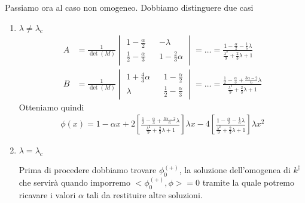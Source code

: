 Passiamo ora al caso non omogeneo. Dobbiamo distinguere due casi
\begin{enumerate}
	\item  $\lambda \neq \lambda_c$
	\begin{align}
		A &= \frac{1}{\det (M)} \begin{vmatrix} 
			1 - \frac{\alpha}{2} && -\lambda \\
			\frac{1}{2} - \frac{\alpha}{3} && 1 - \frac{2}{3}\alpha		
		\end{vmatrix} = \dots = \frac{1 - \frac{\alpha}{2} - \frac{1}{6} \lambda}{\frac{\lambda^2}{9} + \frac{2}{3}\lambda + 1} \\
		B &= \frac{1}{\det (M)} \begin{vmatrix} 
			1 + \frac{4}{3}\alpha && 1 - \frac{\alpha}{2} \\
			\lambda && \frac{1}{2} - \frac{\alpha}{3}		
		\end{vmatrix} = \dots = \frac{\frac{1}{2} - \frac{\alpha}{3} + \frac{3\alpha -2}{6} \lambda}{\frac{\lambda^2}{9} + \frac{2}{3}\lambda + 1}	
	\end{align}
	Otteniamo quindi
	\begin{align}
		\phi(x) = 1 -\alpha x + 2 \left[ \frac{\frac{1}{2} - \frac{\alpha}{3} + \frac{3\alpha -2}{6} \lambda}{\frac{\lambda^2}{9} + \frac{2}{3}\lambda + 1} \right] \lambda x - 4 \left[ \frac{1 - \frac{\alpha}{2} - \frac{1}{6} \lambda}{\frac{\lambda^2}{9} + \frac{2}{3}\lambda + 1} \right] \lambda x^2
	\end{align}
	
	\item  $\lambda = \lambda_c$
	
	Prima di procedere dobbiamo trovare $\phi_0^{(+)}$, la soluzione dell'omogenea di $k^\dagger$ che servirà quando imporremo $<\phi_0^{(+)}, \phi> = 0$ tramite la quale potremo ricavare i valori $\alpha$ tali da restituire altre soluzioni. 
	

\end{enumerate}
